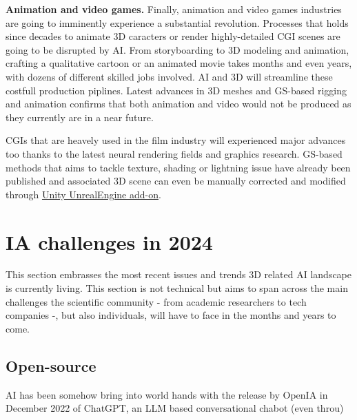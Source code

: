 \noindent \textbf{Animation and video games.} Finally, animation and video games industries are going to imminently experience a substantial revolution. Processes that holds since decades to animate 3D caracters or render highly-detailed \ac{CGI} scenes are going to be disrupted by \ac{AI}. From storyboarding to 3D modeling and animation, crafting a qualitative cartoon or an animated movie takes months and even years, with dozens of different skilled jobs involved. \ac{AI} and 3D will streamline these costfull production piplines. Latest advances in 3D meshes and \ac{GS}-based rigging and animation \citep{qian2023gaussianavatars,li2024animatablegaussians} confirms that both animation and video would not be produced as they currently are in a near future. 

\ac{CGI}s that are heavely used in the film industry will experienced major advances too thanks to the latest neural rendering fields and graphics research. \ac{GS}-based methods that aims to tackle texture, shading or lightning issue have already been published \citep{jiang2023gaussianshader,wu2024deferredgs} and associated 3D scene can even be manually corrected and modified through \href{https://github.com/aras-p/UnityGaussianSplatting/}{Unity UnrealEngine add-on}. 


\section{IA challenges in 2024}

This section embrasses the most recent issues and trends 3D related \ac{AI} landscape is currently living. This section is not technical but aims to span across the main challenges the scientific community - from academic researchers to tech companies -, but also individuals, will have to face in the months and years to come. 

\subsection{Open-source}
\ac{AI} has been somehow bring into world hands with the release by OpenIA in December 2022 of ChatGPT, an \ac{LLM} based conversational chabot (even throu)

